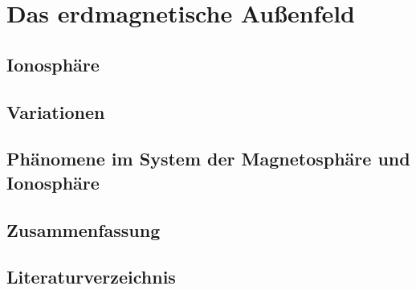 \documentclass[
  a4paper,
  DIV=11]{scrreprt}
\begin{document}
\part{Das erdmagnetische Außenfeld}

\hypertarget{ionosphuxe4re}{%
\chapter{Ionosphäre}\label{ionosphuxe4re}}

\hypertarget{variationen}{%
\chapter{Variationen}\label{variationen}}


\hypertarget{phuxe4nomene-im-system-der-magnetosphuxe4re-und-ionosphuxe4re}{%
\chapter{Phänomene im System der Magnetosphäre und
Ionosphäre}\label{phuxe4nomene-im-system-der-magnetosphuxe4re-und-ionosphuxe4re}}


\hypertarget{zusammenfassung}{%
\chapter{Zusammenfassung}\label{zusammenfassung}}


\hypertarget{literaturverzeichnis}{%
\chapter*{Literaturverzeichnis}\label{literaturverzeichnis}}

\end{document}
